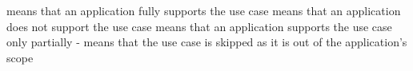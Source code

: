  means that an application fully supports the use case \newline
{} means that an application does not support the use case \newline
{} means that an application supports the use case only partially \newline
- means that the use case is skipped as it is out of the application's scope \newline

